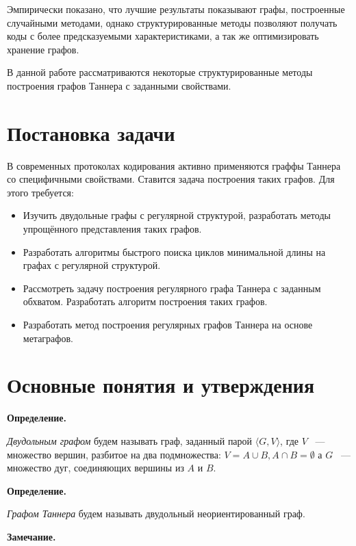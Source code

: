 \documentclass[14pt]{mmcs-article}
\begin{document}
Эмпирически показано, что лучшие результаты показывают графы, построенные случайными методами, однако структурированные методы позволяют получать коды с более предсказуемыми характеристиками, а так же оптимизировать хранение графов. 

В данной работе рассматриваются некоторые структурированные методы построения графов Таннера с заданными свойствами.

\newpage
{}

\section*{Постановка задачи}

В современных протоколах кодирования активно применяются граффы Таннера со специфичными свойствами. Ставится задача построения таких графов. Для этого требуется:

\begin{itemize}
  \item Изучить двудольные графы с регулярной структурой, разработать методы упрощённого представления таких графов.
  \item Разработать алгоритмы быстрого поиска циклов минимальной длины на графах с регулярной структурой.
  \item Рассмотреть задачу построения регулярного графа Таннера с заданным обхватом. Разработать алгоритм построения таких графов.
  \item Разработать метод построения регулярных графов Таннера на основе метаграфов.
\end{itemize}

\newpage
\section{Основные понятия и утверждения}

\textbf{Определение.}

\textsl{Двудольным графом} будем называть граф, заданный парой $\langle G, V \rangle$, где $V$ ~--- множество вершин, разбитое на два подмножества: $V = A \cup B, A \cap B = \emptyset$ а $G$ ~--- множество дуг, соединяющих вершины из $A$ и $B$.

\textbf{Определение.}

\textsl{Графом Таннера} будем называть двудольный неориентированный граф.

\textbf{Замечание.}
\end{document}
